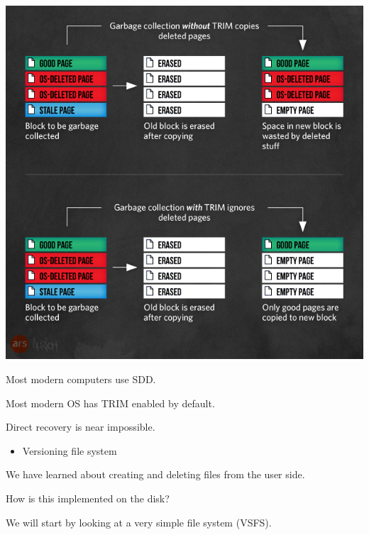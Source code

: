 \begin{slide}


    \includegraphics[height=0.75\textheight]{ssd-trim.png}

\end{slide}

\begin{slide}


    Most modern computers use SDD.
    \bigskip

    Most modern OS has TRIM enabled by default.
    \bigskip

    Direct recovery is near impossible.
    \begin{itemize}
        \item Versioning file system
    \end{itemize}

\end{slide}

\begin{slide}


    We have learned about creating and deleting files from the user side.
    \bigskip

    How is this implemented on the disk?
    \bigskip

    We will start by looking at a very simple file system (VSFS).

\end{slide}

